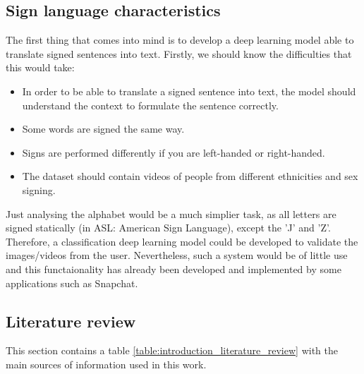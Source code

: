 \subsection{Sign language characteristics}
The first thing that comes into mind is to develop a deep learning model able to translate signed sentences into 
text. Firstly, we should know the difficulties that this would take:
\begin{itemize}[noitemsep]
    \item In order to be able to translate a signed sentence into text, the model should understand the context to formulate the sentence correctly.
    \item Some words are signed the same way.
    \item Signs are performed differently if you are left-handed or right-handed.
    \item The dataset should contain videos of people from different ethnicities and sex signing.
\end{itemize}

Just analysing the alphabet would be a much simplier task, as all letters are signed statically (in ASL: American Sign Language), except the 'J' and 'Z'.
Therefore, a classification deep learning model could be developed to validate the images/videos from the user.
Nevertheless, such a system would be of little use and this functaionality has already been developed and implemented by some applications such as Snapchat.

\subsection{Literature review}
This section contains a table \ref{table:introduction_literature_review} with the main sources of information used in this work. \\

